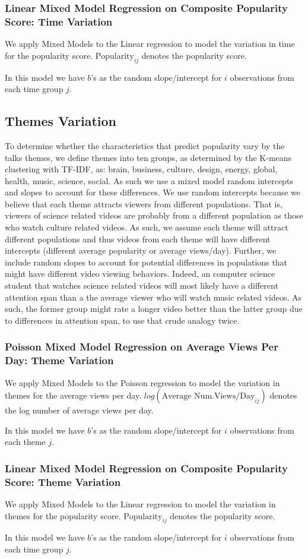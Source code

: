 \subsubsection{Linear Mixed Model Regression on Composite Popularity Score: Time Variation}
We apply Mixed Models to the Linear regression to model the variation in time for the popularity score. $\text{Popularity}_{ij}$ denotes the popularity score.

In this model we have $b$'s as the random slope/intercept for $i$ observations from each time group $j$.

\subsection{Themes Variation}
To determine whether the characteristics that predict popularity vary by the talks themes, we define themes into ten groups, as determined by the K-means clustering with TF-IDF, as: brain, business, culture, design, energy, global, health, music, science, social. As such we use a mixed model random intercepts and slopes to account for these differences.
We use random intercepts because we believe that each theme attracts viewers from different populations. That is, viewers of science related videos are probably from a different population as those who watch culture related videos. As such, we assume each theme will attract different populations and thus videos from each theme will have different intercepts (different average popularity or average views/day).
Further, we include random slopes to account for potential differences in populations that might have different video viewing behaviors. Indeed, an computer science student that watches science related videos will most likely have a different attention span than a the average viewer who will watch music related videos. As such, the former group might rate a longer video better than the latter group due to differences in attention span, to use that crude analogy twice. 

\subsubsection{Poisson Mixed Model Regression on Average Views Per Day: Theme Variation}
We apply Mixed Models to the Poisson regression to model the variation in themes for the average views per day. $log(\text{Average Num.Views/Day}_{ij})$ denotes the log number of average views per day.

In this model we have $b$'s as the random slope/intercept for $i$ observations from each theme $j$.

\subsubsection{Linear Mixed Model Regression on Composite Popularity Score: Theme Variation}
We apply Mixed Models to the Linear regression to model the variation in themes for the popularity score. $\text{Popularity}_{ij}$ denotes the popularity score.

In this model we have $b$'s as the random slope/intercept for $i$ observations from each time group $j$.


